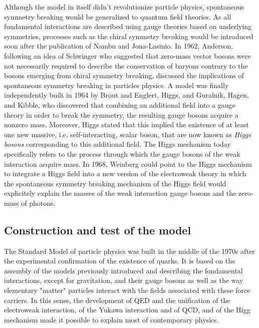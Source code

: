 	Although the model in itself didn't revolutionize particle physics, spontaneous symmetry breaking would be generalized to quantum field theories. As all fundamental interactions are described using gauge theories based on underlying symmetries, processes such as the chiral symmetry breaking would be introduced soon after the publication of Nambu and Jona-Lasinio. In 1962, Anderson, following an idea of Schwinger who suggested that zero-mass vector bosons were not necessarily required to describe the conservation of baryons contrary to the bosons emerging from chiral symmetry breaking, discussed the implications of spontaneous symmetry breaking in particles physics. A model was finally independently built in 1964 by Brout and Englert, Higgs, and Guralnik, Hagen, and Kibble, who discovered that combining an additional field into a gauge theory in order to break the symmetry, the resulting gauge bosons acquire a nonzero mass. Moreover, Higgs stated that this implied the existence of at least one new massive, i.e. self-interacting, scalar boson, that are now known as \textit{Higgs bosons} corresponding to this additional field. The Higgs mechanism today specifically refers to the process through which the gauge bosons of the weak interaction acquire mass. In 1968, Weinberg could point to the Higgs mechanism to integrate a Higgs field into a new version of the electroweak theory in which the spontaneous symmetry breaking mechanism of the Higgs field would explicitely explain the masses of the weak interaction gauge bosons and the zero-mass of photons.
	
	\subsection{Construction and test of the model}
	\label{chapt2:ssec:model}
	
	The Standard Model of particle physics was built in the middle of the 1970s after the experimental confirmation of the existence of quarks. It is based on the assembly of the models previously introduced and describing the fondamental interactions, except for gravitation, and their gauge bosons as well as the way elementary "matter" particles interact with the fields associated with these force carriers. In this sense, the development of QED and the unification of the electroweak interaction, of the Yukawa interaction and of QCD, and of the Higg mechanism made it possible to explain most of contemporary physics.
	
